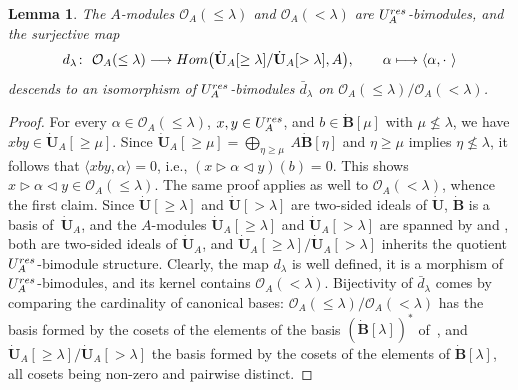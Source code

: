 \documentclass[11pt]{article}
\numberwithin{equation}{section}
\numberwithin{equation}{section}
\newtheorem{lem}[teo]{Lemma}
\theoremstyle{definition}
\newcommand{\Oo}{{\mathcal O}}
\newcommand{\smallbullet}{%
\vcenter{\hbox{\,\scalebox{0.5}{$\bullet$}\,}}
}
\begin{document}
\begin{lem} The $A$-modules $\Oo_A(\leq \lambda)$ and $\Oo_A(< \lambda)$ are $U_A^{\rm res}$-bimodules, and the surjective map
\begin{gather}\label{dlambdamap}
d_\lambda\colon\ \Oo_A(\leq \lambda)\longrightarrow {\rm Hom}\bigl( \dot{\mathbf{U}}_A [\geq \lambda]/ \dot{\mathbf{U}}_A [> \lambda],A\bigr),\qquad \alpha\longmapsto\langle \alpha , \cdot \ \rangle
\end{gather}
descends to an isomorphism of $U_A^{\rm res}$-bimodules $\bar{d}_\lambda$ on $\Oo_A(\leq \lambda)/\Oo_A(< \lambda)$.
\end{lem}
\begin{proof} For every $\alpha\in \Oo_A(\leq \lambda)$, $x,y\in U_A^{\rm res}$, and $b\in \dot{\mathbf{B}} [\mu]$ with $\mu \nleqslant \lambda$, we have $xby \in \dot{\mathbf{U}}_A [\geq \mu]$. Since $\dot{\mathbf{U}}_A [\geq \mu]= \bigoplus_{\eta\geq \mu}\ A\dot{\mathbf{B}}[\eta]$ and $\eta\geq \mu$ implies $\eta \nleqslant \lambda$, it follows that $\langle xby, \alpha\rangle=0$, i.e., $(x\rhd \alpha \lhd y)(b)=0$. This shows $x\rhd \alpha \lhd y \in \Oo_A(\leq \lambda)$. The same proof applies as well to $\Oo_A(<\lambda)$, whence the first claim. Since $\dot{\mathbf{U}} [\geq \lambda]$ and $\dot{\mathbf{U}} [> \lambda]$ are two-sided ideals of $\dot{\mathbf{U}}$, $\dot{\mathbf{B}}$ is a basis of~$\dot{\mathbf{U}}_A$, and the $A$-modules $\dot{\mathbf{U}}_A [\geq \lambda]$ and $\dot{\mathbf{U}}_A [> \lambda]$ are spanned by  and , both are two-sided ideals of $\dot{\mathbf{U}}_A$, and $\dot{\mathbf{U}}_A [\geq \lambda]/ \dot{\mathbf{U}}_A [> \lambda]$ inherits the quotient $U_A^{\rm res}$-bimodule structure. Clearly, the map $d_\lambda$ is well defined, it is a morphism of $U_A^{\rm res}$-bimodules, and its kernel contains $\Oo_A(< \lambda)$. Bijectivity of $\bar{d}_\lambda$ comes by comparing the cardinality of canonical bases: $\Oo_A(\leq \lambda)/\Oo_A(< \lambda)$ has the basis formed by the cosets of the elements of the basis $(\dot{\mathbf{B}}[\lambda])^*$ of~\smash{${}_A \overset{\raisebox{-1.5pt}{\scriptsize$\smallbullet$}}{C} (\lambda')$}, and $\dot{\mathbf{U}}_A [\geq \lambda]/ \dot{\mathbf{U}}_A [> \lambda]$ the basis formed by the cosets of the elements of $\dot{\mathbf{B}}[\lambda]$, all cosets being non-zero and pairwise distinct.
\end{proof}
\end{document}
